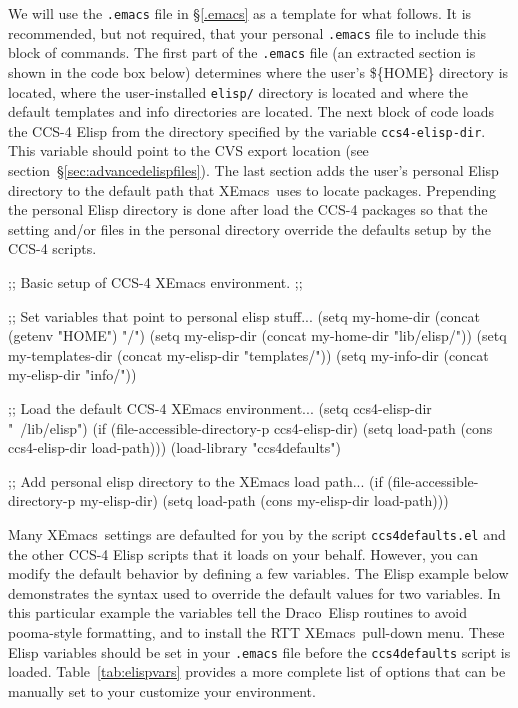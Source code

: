 \documentclass[11pt]{nmemo}
\newcommand{\comp}[1]{{\normalfont\texttt{\footnotesize{#1}}}}
\newcommand{\draco}{{\normalfont\sffamily Draco}}
\newcommand{\xemacs}{{\normalfont\sffamily XEmacs}}
\newenvironment{codeExample}
{\footnotesize 
  \VerbatimEnvironment
  \begin{SaveVerbatim}{\mycode}}%
  {\end{SaveVerbatim}%
  \noindent%
  \parashade[.950]{sharpcorners}{\gdef\outlineboxwidth{.5}%
    \UseVerbatim{\mycode}}\normalsize}
\begin{document}
We will use the \comp{.emacs} file in \S\ref{.emacs} as a template
for what follows.  It is recommended, but not required, that your
personal \comp{.emacs} file to include this block of commands.  The
first part of the \comp{.emacs} file (an extracted section is shown in
the code box below) determines where the user's \$\{HOME\} directory
is located, where the user-installed \comp{elisp/} directory is
located and where the default templates and info directories are
located.  The next block of code loads the CCS-4 Elisp from the
directory specified by the variable \comp{ccs4-elisp-dir}.  This
variable should point to the CVS export location (see
section~\S\ref{sec:advancedelispfiles}).  The last section adds the
user's personal Elisp directory to the default path that \xemacs\ uses
to locate packages.  Prepending the personal Elisp directory is done
after load the CCS-4 packages so that the setting and/or files in the
personal directory override the defaults setup by the CCS-4 scripts.

\begin{codeExample}
;; Basic setup of CCS-4 XEmacs environment.
;;

;; Set variables that point to personal elisp stuff...
(setq my-home-dir (concat (getenv "HOME") "/")
(setq my-elisp-dir (concat my-home-dir "lib/elisp/"))
(setq my-templates-dir (concat my-elisp-dir "templates/"))
(setq my-info-dir (concat my-elisp-dir "info/"))

;; Load the default CCS-4 XEmacs environment...
(setq ccs4-elisp-dir "~/lib/elisp")
(if (file-accessible-directory-p ccs4-elisp-dir)
   (setq load-path (cons ccs4-elisp-dir load-path)))
(load-library "ccs4defaults")

;; Add personal elisp directory to the XEmacs load path...
(if (file-accessible-directory-p my-elisp-dir)
   (setq load-path (cons my-elisp-dir load-path)))
\end{codeExample}

Many \xemacs\ settings are defaulted for you by the script
\comp{ccs4defaults.el} and the other CCS-4 Elisp scripts that it loads
on your behalf.  However, you can modify the default behavior by
defining a few variables.  The Elisp example below demonstrates the
syntax used to override the default values for two variables.  In this
particular example the variables tell the \draco\ Elisp routines to
avoid pooma-style formatting, and to install the RTT \xemacs\ 
pull-down menu.  These Elisp variables should be set in your
\comp{.emacs} file before the \comp{ccs4defaults} script is loaded.
Table~\ref{tab:elispvars} provides a more complete list of options
that can be manually set to your customize your environment.
\end{document}

